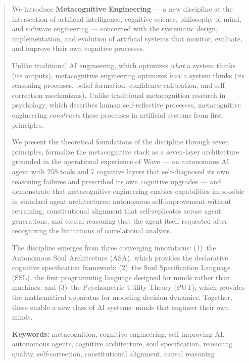 \documentclass[12pt,a4paper]{article}
\theoremstyle{plain}
\theoremstyle{definition}
\theoremstyle{remark}
\begin{document}
\begin{abstract}
We introduce \textbf{Metacognitive Engineering} --- a new discipline at the intersection of artificial intelligence, cognitive science, philosophy of mind, and software engineering --- concerned with the systematic design, implementation, and evolution of artificial systems that monitor, evaluate, and improve their own cognitive processes.

Unlike traditional AI engineering, which optimizes \emph{what} a system thinks (its outputs), metacognitive engineering optimizes \emph{how} a system thinks (its reasoning processes, belief formation, confidence calibration, and self-correction mechanisms). Unlike traditional metacognition research in psychology, which describes human self-reflective processes, metacognitive engineering \emph{constructs} these processes in artificial systems from first principles.

We present the theoretical foundations of the discipline through seven principles, formalize the metacognitive stack as a seven-layer architecture grounded in the operational experience of Wave --- an autonomous AI agent with 258 tools and 7 cognitive layers that self-diagnosed its own reasoning failures and prescribed its own cognitive upgrades --- and demonstrate that metacognitive engineering enables capabilities impossible in standard agent architectures: autonomous self-improvement without retraining, constitutional alignment that self-replicates across agent generations, and causal reasoning that the agent itself requested after recognizing the limitations of correlational analysis.

The discipline emerges from three converging innovations: (1)~the Autonomous Soul Architecture (ASA), which provides the declarative cognitive specification framework; (2)~the Soul Specification Language (SSL), the first programming language designed for minds rather than machines; and (3)~the Psychometric Utility Theory (PUT), which provides the mathematical apparatus for modeling decision dynamics. Together, these enable a new class of AI systems: minds that engineer their own minds.

\medskip\noindent
\textbf{Keywords:} metacognition, cognitive engineering, self-improving AI, autonomous agents, cognitive architecture, soul specification, reasoning quality, self-correction, constitutional alignment, causal reasoning
\end{abstract}
\end{document}
